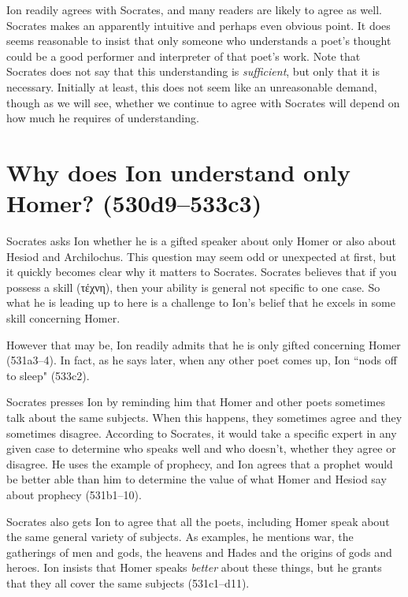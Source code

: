 \documentclass[11pt,letterpaper]{article}
\begin{document}
Ion readily agrees with Socrates, and many readers are likely to agree as well. Socrates makes an apparently intuitive and perhaps even obvious point. It does seems reasonable to insist that only someone who understands a poet's thought could be a good performer and interpreter of that poet's work. Note that Socrates does not say that this understanding is \emph{sufficient}, but only that it is necessary. Initially at least, this does not seem like an unreasonable demand, though as we will see, whether we continue to agree with Socrates will depend on how much he requires of understanding.

\section{Why does Ion understand only Homer? (530d9--533c3)}

Socrates asks Ion whether he is a gifted speaker about only Homer or also about Hesiod and Archilochus. This question may seem odd or unexpected at first, but it quickly becomes clear why it matters to Socrates. Socrates believes that if you possess a skill (\textgreek{τέχνη}), then your ability is general not specific to one case. So what he is leading up to here is a challenge to Ion's belief that he excels in some skill concerning Homer.

However that may be, Ion readily admits that he is only gifted concerning Homer (531a3--4). In fact, as he says later, when any other poet comes up, Ion ``nods off to sleep" (533c2).

Socrates presses Ion by reminding him that Homer and other poets sometimes talk about the same subjects. When this happens, they sometimes agree and they sometimes disagree. According to Socrates, it would take a specific expert in any given case to determine who speaks well and who doesn't, whether they agree or disagree. He uses the example of prophecy, and Ion agrees that a prophet would be better able than him to determine the value of what Homer and Hesiod say about prophecy (531b1--10).

Socrates also gets Ion to agree that all the poets, including Homer speak about the same general variety of subjects. As examples, he mentions war, the gatherings of men and gods, the heavens and Hades and the origins of gods and heroes. Ion insists that Homer speaks \emph{better} about these things, but he grants that they all cover the same subjects (531c1--d11).
\end{document}
